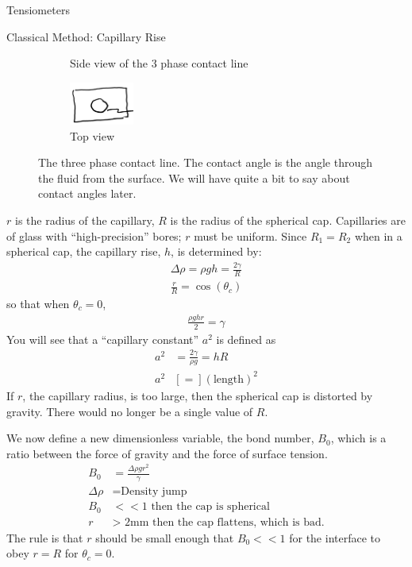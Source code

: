 \documentclass{article}
\begin{document}
\begin{section}{Tensiometers}
\begin{subsection}{Classical Method: Capillary Rise}
\begin{figure}[b]
\begin{subfigure}[t]{0.3\textwidth}
			\caption{Side view of the 3 phase contact line}
		\end{subfigure}
		\begin{subfigure}[t]{0.3\textwidth}
			\centering
			\includegraphics[height=40pt]{3phasecontacttop}
			\caption{Top view}
		\end{subfigure}
		\caption{The three phase contact line. The contact angle is the angle through the fluid from the surface. We will have quite a bit to say about contact angles later. }
		\label{fig:threephase}
	\end{figure}
	$r$ is the radius of the capillary, $R$ is the radius of the spherical cap. Capillaries are of glass with ``high-precision'' bores; $r$ must be uniform.
	Since $R_1=R_2$ when in a spherical cap, the capillary rise, $h$, is determined by:
	\begin{align*}
		\Delta\rho = \rho g h = \frac{2\gamma}{R}\\
		\frac{r}{R}=\cos{(\theta_c)}
	\end{align*}
	so that when $\theta_c = 0$,
	\begin{align*}
		\frac{\rho g h r}{2} = \gamma
	\end{align*}
	You will see that a ``capillary constant'' $a^2$ is defined as 
	\begin{align*}
		a^2 &= \frac{2\gamma}{\rho g} = h R\\
 		a^2 &[=] (\text{length})^2
	\end{align*}
	If $r$, the capillary radius, is too large, then the spherical cap is distorted by gravity. There would no longer be a single value of $R$.

	
We now define a new dimensionless variable, the bond number, $B_0$, which is a ratio between the force of gravity and the force of surface tension.
\begin{align*}
	B_0 &= \frac{\Delta \rho g r^2}{\gamma}\\
	\Delta\rho &= \text{Density jump}\\
	B_0 &<< 1 \text{ then the cap is spherical}\\
	r &>\text{ 2mm then the cap flattens, which is bad.}
\end{align*}
The rule is that $r$ should be small enough that $B_0 << 1$ for the interface to obey $r=R$ for $\theta_c = 0$.


\end{subsection}
\end{section}
\end{document}
